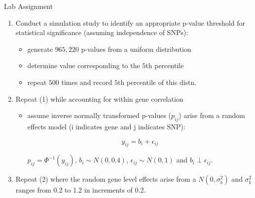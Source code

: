 \begin{frame}{Lab Assignment}
\begin{enumerate}
\item Conduct a simulation study to identify an appropriate p-value threshold for statistical significance (assuming independence of SNPs):
\begin{itemize}
	\item generate $965,220$ p-values from a uniform distribution
	\item determine value corresponding to the $5$th percentile
	\item repeat $500$ times and record $5$th percentile of this distn.
	\end{itemize}
\item Repeat (1) while accounting for within gene correlation
	\begin{itemize}
	\item assume inverse normally transformed p-values ($p_{ij}$) arise from a random effects model (i indicates gene and j indicates SNP):
	
	\begin{equation*}
	y_{ij}= b_i +\epsilon_{ij}
	\end{equation*}
	
	$p_{ij}=\Phi^{-1}(y_{ij})$, $b_i \sim N(0,0.4)$, $\epsilon_{ij} \sim N(0,1)$ and $b_i \perp \epsilon_{ij}$.
	 
	\end{itemize}
\item Repeat (2) where the random gene level effects arise from a $N(0,\sigma_b^2)$ and $\sigma_b^2$ ranges from 0.2 to 1.2 in increments of 0.2. 
\end{enumerate} 
\end{frame}

